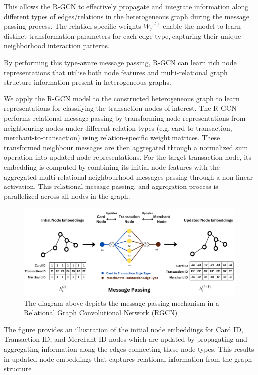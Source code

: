 \documentclass[pdflatex,sn-mathphys-num]{sn-jnl}%
\begin{document}
This allows the R-GCN to effectively propagate and integrate information along different types of edges/relations in the heterogeneous graph during the message passing process. The relation-specific weights $W_r^{(l)}$ enable the model to learn distinct transformation parameters for each edge type, capturing their unique neighborhood interaction patterns.

By performing this type-aware message passing, R-GCN can learn rich node representations that utilise both node features and multi-relational graph structure information present in heterogeneous graphs.

We apply the R-GCN model to the constructed heterogeneous graph to learn representations for classifying the transaction nodes of interest. The R-GCN performs relational message passing by transforming node representations from neighbouring nodes under different relation types (e.g. card-to-transaction, merchant-to-transaction) using relation-specific weight matrices. These transformed neighbour messages are then aggregated through a normalized sum operation into updated node representations. For the target transaction node, its embedding is computed by combining its initial node features with the aggregated multi-relational neighbourhood messages passing through a non-linear activation. This relational message passing, and aggregation process is parallelized across all nodes in the graph.

\clearpage

\begin{figure}[h]
\centering
\includegraphics[width=1.0\textwidth]{RGCN_message_passing.png}
\caption{The diagram above depicts the message passing mechanism in a Relational Graph Convolutional Network (RGCN) }\label{fig3}
\end{figure}


The figure provides an illustration of the initial node embeddings for Card ID, Transaction ID, and Merchant ID nodes which are updated by propagating and aggregating information along the edges connecting these node types. This results in updated node embeddings that captures relational information from the graph structure
\end{document}
